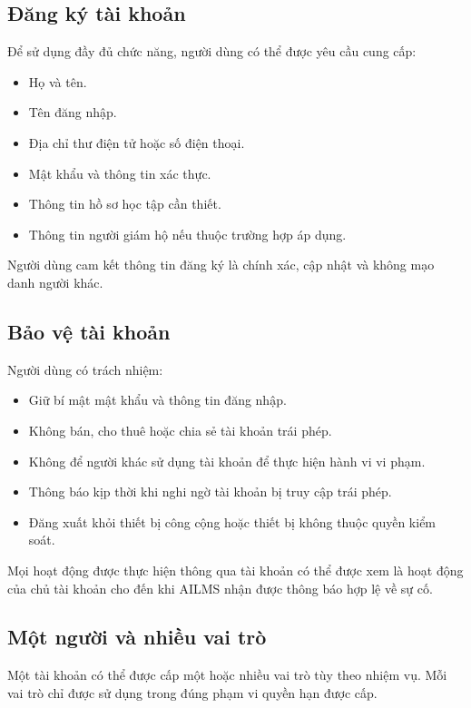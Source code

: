 \documentclass[12pt,a4paper]{article}
\begin{document}
\subsection{Đăng ký tài khoản}

Để sử dụng đầy đủ chức năng, người dùng có thể được yêu cầu cung cấp:

\begin{itemize}
    \item Họ và tên.
    \item Tên đăng nhập.
    \item Địa chỉ thư điện tử hoặc số điện thoại.
    \item Mật khẩu và thông tin xác thực.
    \item Thông tin hồ sơ học tập cần thiết.
    \item Thông tin người giám hộ nếu thuộc trường hợp áp dụng.
\end{itemize}

Người dùng cam kết thông tin đăng ký là chính xác, cập nhật và không mạo danh người khác.

\subsection{Bảo vệ tài khoản}

Người dùng có trách nhiệm:

\begin{itemize}
    \item Giữ bí mật mật khẩu và thông tin đăng nhập.
    \item Không bán, cho thuê hoặc chia sẻ tài khoản trái phép.
    \item Không để người khác sử dụng tài khoản để thực hiện hành vi vi phạm.
    \item Thông báo kịp thời khi nghi ngờ tài khoản bị truy cập trái phép.
    \item Đăng xuất khỏi thiết bị công cộng hoặc thiết bị không thuộc quyền kiểm soát.
\end{itemize}

Mọi hoạt động được thực hiện thông qua tài khoản có thể được xem là hoạt động
của chủ tài khoản cho đến khi AILMS nhận được thông báo hợp lệ về sự cố.

\subsection{Một người và nhiều vai trò}

Một tài khoản có thể được cấp một hoặc nhiều vai trò tùy theo nhiệm vụ.
Mỗi vai trò chỉ được sử dụng trong đúng phạm vi quyền hạn được cấp.
\end{document}
